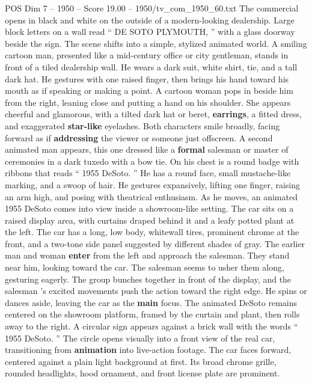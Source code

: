 \begin{textsample}{POS Dim 7 – 1950 – Score 19.00 – 1950/tv\_com\_1950\_60.txt}  \label{ex:f7_pos_006}
The commercial opens in black and white on the outside of a modern-looking dealership.
Large block letters on a wall read “ DE SOTO PLYMOUTH, ” with a glass doorway beside the sign.
The scene shifts into a simple, stylized animated world.
A smiling cartoon man, presented like a mid-century office or city gentleman, stands in front of a tiled dealership wall.
He wears a dark suit, white shirt, tie, and a tall dark hat.
He gestures with one raised finger, then brings his hand toward his mouth as if speaking or making a point.
A cartoon woman pops in beside him from the right, leaning close and putting a hand on his shoulder.
She appears cheerful and glamorous, with a tilted dark hat or beret, \textbf{earrings}, a fitted dress, and exaggerated \textbf{star-like} eyelashes.
Both characters smile broadly, facing forward as if \textbf{addressing} the viewer or someone just offscreen.
A second animated man appears, this one dressed like a \textbf{formal} salesman or master of ceremonies in a dark tuxedo with a bow tie.
On his chest is a round badge with ribbons that reads “ 1955 DeSoto. ” He has a round face, small mustache-like marking, and a swoop of hair.
He gestures expansively, lifting one finger, raising an arm high, and posing with theatrical enthusiasm.
As he moves, an animated 1955 DeSoto comes into view inside a showroom-like setting.
The car sits on a raised display area, with curtains draped behind it and a leafy potted plant at the left.
The car has a long, low body, whitewall tires, prominent chrome at the front, and a two-tone side panel suggested by different shades of gray.
The earlier man and woman \textbf{enter} from the left and approach the salesman.
They stand near him, looking toward the car.
The salesman seems to usher them along, gesturing eagerly.
The group bunches together in front of the display, and the salesman ’s excited movements push the action toward the right edge.
He spins or dances aside, leaving the car as the \textbf{main} focus.
The animated DeSoto remains centered on the showroom platform, framed by the curtain and plant, then rolls away to the right.
A circular sign appears against a brick wall with the words “ 1955 DeSoto. ” The circle opens visually into a front view of the real car, transitioning from \textbf{animation} into live-action footage.
The car faces forward, centered against a plain light background at first.
Its broad chrome grille, rounded headlights, hood ornament, and front license plate are prominent.

\end{textsample}
